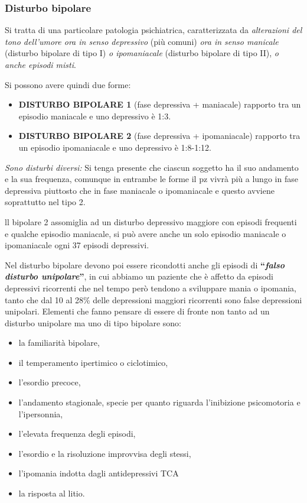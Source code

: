\subsubsection{Disturbo bipolare}

Si tratta di una particolare patologia psichiatrica, caratterizzata da
\emph{alterazioni del tono dell'umore ora in senso depressivo} (più
comuni) \emph{ora in senso manicale} (disturbo bipolare di tipo I)
\emph{o ipomaniacale} (disturbo bipolare di tipo II), \emph{o anche
episodi misti}.

Si possono avere quindi due forme:

\begin{itemize}
\item
  \textbf{DISTURBO BIPOLARE 1} (fase depressiva + maniacale) rapporto
  tra un episodio maniacale e uno depressivo è 1:3.
\item
  \textbf{DISTURBO BIPOLARE 2} (fase depressiva + ipomaniacale) rapporto
  tra un episodio ipomaniacale e uno depressivo è 1:8-1:12.
\end{itemize}

\emph{Sono disturbi diversi:} Si tenga presente che ciascun soggetto ha
il suo andamento e la sua frequenza, comunque in entrambe le forme il pz
vivrà più a lungo in fase depressiva piuttosto che in fase maniacale o
ipomaniacale e questo avviene soprattutto nel tipo 2.

ll bipolare 2 assomiglia ad un disturbo depressivo maggiore con episodi
frequenti e qualche episodio maniacale, si può avere anche un solo
episodio maniacale o ipomaniacale ogni 37 episodi depressivi.

Nel disturbo bipolare devono poi essere ricondotti anche gli episodi di
\textbf{``\emph{falso disturbo unipolare}''}, in cui abbiamo un paziente
che è affetto da episodi depressivi ricorrenti che nel tempo però
tendono a sviluppare mania o ipomania, tanto che dal 10 al 28\% delle
depressioni maggiori ricorrenti sono false depressioni unipolari.
Elementi che fanno pensare di essere di fronte non tanto ad un disturbo
unipolare ma uno di tipo bipolare sono:

\begin{itemize}
\item
  la familiarità bipolare,
\item
  il temperamento ipertimico o ciclotimico,
\item
  l'esordio precoce,
\item
  l'andamento stagionale, specie per quanto riguarda l'inibizione
  psicomotoria e l'ipersonnia,
\item
  l'elevata frequenza degli episodi,
\item
  l'esordio e la risoluzione improvvisa degli stessi,
\item
  l'ipomania indotta dagli antidepressivi TCA
\item
  la risposta al litio.
\end{itemize}

